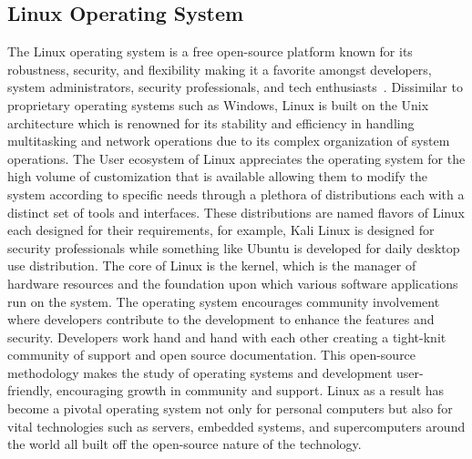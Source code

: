 \documentclass[manuscript,acmsmall,anonymous,review,screen,nonacm=true, authorversion=true]{acmart}
\begin{document}
\subsection{ Linux Operating System}
The Linux operating system is a free open-source platform known for its robustness,
security, and flexibility making it a favorite amongst developers, system administrators, security
professionals, and tech enthusiasts~\cite{linux,ubuntu}. Dissimilar to proprietary operating systems such as
Windows, Linux is built on the Unix architecture which is renowned for its stability and
efficiency in handling multitasking and network operations due to its complex organization of
system operations. The User ecosystem of Linux appreciates the operating system for the
high volume of customization that is available allowing them to modify the system according to
specific needs through a plethora of distributions each with a distinct set of tools and
interfaces. These distributions are named flavors of Linux each designed for their
requirements, for example, Kali Linux is designed for security professionals while something
like Ubuntu is developed for daily desktop use distribution. The core of Linux is the kernel,
which is the manager of hardware resources and the foundation upon which various software applications run on the system. The operating system encourages community involvement
where developers contribute to the development to enhance the features and security.
Developers work hand and hand with each other creating a tight-knit community of support and
open source documentation. This open-source methodology makes the study of operating
systems and development user-friendly, encouraging growth in community and support.
Linux as a result has become a pivotal operating system not only for personal computers but also
for vital technologies such as servers, embedded systems, and supercomputers around the world
all built off the open-source nature of the technology.
\end{document}

